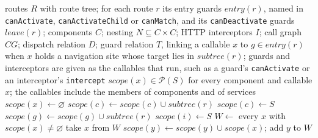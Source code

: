 \begin{algorithm}[t]
\footnotesize
\caption{Scope attribution as a worklist fixpoint over $\mathcal{P}(S)$.}
\label{alg:attribution}
\begin{algorithmic}[1]
\Require routes $R$ with route tree; for each route $r$ its entry guards $\mathit{entry}(r)$,
  named in \texttt{canActivate}, \texttt{canActivateChild} or \texttt{canMatch}, and its
  \texttt{canDeactivate} guards $\mathit{leave}(r)$; components $C$; nesting
  $N \subseteq C \times C$; HTTP interceptors $I$; call graph $\mathit{CG}$; dispatch relation
  $D$; guard relation $T$, linking a callable $x$ to $g \in \mathit{entry}(r)$ when $x$ holds a
  navigation site whose target lies in $\mathit{subtree}(r)$; guards and interceptors are given as
  the callables that run, such as a guard's \texttt{canActivate} or an interceptor's \texttt{intercept}
\Ensure $\mathit{scope}(x) \in \mathcal{P}(S)$ for every component and callable $x$; the
  callables include the members of components and of services
 $\mathit{scope}(x) \gets \varnothing$ \EndFor
{}
  \State $\mathit{scope}(c) \gets \mathit{scope}(c) \cup \mathit{subtree}(r)$
\EndFor
{}
  \State $\mathit{scope}(c) \gets S$ 
\EndFor
{}
  \State $\mathit{scope}(g) \gets \mathit{scope}(g) \cup \mathit{subtree}(r)$
\EndFor
{} 
  \State $\mathit{scope}(i) \gets S$
\EndFor
\State $W \gets$ every $x$ with $\mathit{scope}(x) \neq \varnothing$
  \State take $x$ from $W$
   
    \State {}
  \EndFor
   
    \State {}
  \EndFor
   
    \State {}
  \EndFor
\EndWhile
{}
    \State $\mathit{scope}(y) \gets \mathit{scope}(y) \cup \mathit{scope}(x)$; add $y$ to $W$
  \EndIf
\EndProcedure
\end{algorithmic}
\par{}
\end{algorithm}
